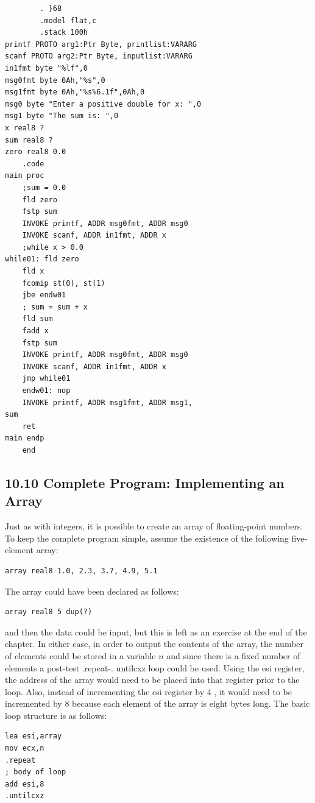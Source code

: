 \documentclass[10pt]{book}
\begin{document}
\begin{center}
\begin{center}
\begin{center}
\begin{center}
\begin{verbatim}
        . }68
        .model flat,c
        .stack 100h
printf PROTO arg1:Ptr Byte, printlist:VARARG
scanf PROTO arg2:Ptr Byte, inputlist:VARARG
in1fmt byte "%lf",0
msg0fmt byte 0Ah,"%s",0
msg1fmt byte 0Ah,"%s%6.1f",0Ah,0
msg0 byte "Enter a positive double for x: ",0
msg1 byte "The sum is: ",0
x real8 ?
sum real8 ?
zero real8 0.0
    .code
main proc
    ;sum = 0.0
    fld zero
    fstp sum
    INVOKE printf, ADDR msg0fmt, ADDR msg0
    INVOKE scanf, ADDR in1fmt, ADDR x
    ;while x > 0.0
while01: fld zero
    fld x
    fcomip st(0), st(1)
    jbe endw01
    ; sum = sum + x
    fld sum
    fadd x
    fstp sum
    INVOKE printf, ADDR msg0fmt, ADDR msg0
    INVOKE scanf, ADDR in1fmt, ADDR x
    jmp while01
    endw01: nop
    INVOKE printf, ADDR msg1fmt, ADDR msg1,
sum
    ret
main endp
    end
\end{verbatim}

\subsection*{10.10 Complete Program: Implementing an Array}
Just as with integers, it is possible to create an array of floating-point numbers. To keep the complete program simple, assume the existence of the following five-element array:


\begin{verbatim}
array real8 1.0, 2.3, 3.7, 4.9, 5.1
\end{verbatim}

The array could have been declared as follows:

\begin{verbatim}
array real8 5 dup(?)
\end{verbatim}

and then the data could be input, but this is left as an exercise at the end of the chapter. In either case, in order to output the contents of the array, the number of elements could be stored in a variable $n$ and since there is a fixed number of elements a post-test .repeat-. untilcxz loop could be used. Using the esi register, the address of the array would need to be placed into that register prior to the loop. Also, instead of incrementing the esi register by 4 , it would need to be incremented by 8 because each element of the array is eight bytes long. The basic loop structure is as follows:

\begin{verbatim}
lea esi,array
mov ecx,n
.repeat
; body of loop
add esi,8
.untilcxz
\end{verbatim}


\end{center}
\end{center}
\end{center}
\end{center}
\end{document}
